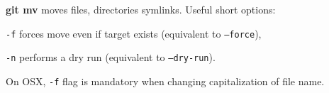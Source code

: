 %

\textbf{git mv} moves files, directories symlinks.
Useful short options:
\begin{compactenum}
\item [\texttt{-f}] forces move even if target exists (equivalent to \texttt{--force}),
\item [\texttt{-n}] performs a dry run (equivalent to \texttt{--dry-run}).
\end{compactenum}

On OSX, \texttt{-f} flag is mandatory when changing capitalization of file name.

%